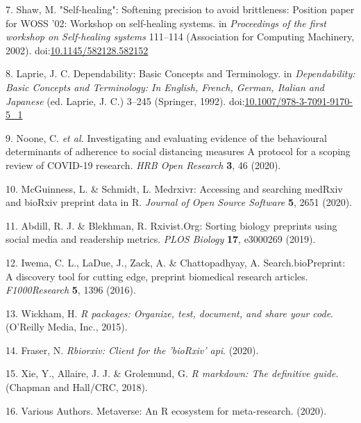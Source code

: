 \documentclass[a4paper, twoside]{templates/ociamthesis}
\begin{document}
\leavevmode\hypertarget{ref-shaw2002}{}%
7. Shaw, M. "Self-healing": Softening precision to avoid brittleness: Position paper for WOSS '02: Workshop on self-healing systems. in \emph{Proceedings of the first workshop on Self-healing systems} 111--114 (Association for Computing Machinery, 2002). doi:\href{https://doi.org/10.1145/582128.582152}{10.1145/582128.582152}

\leavevmode\hypertarget{ref-laprie1992}{}%
8. Laprie, J. C. Dependability: Basic Concepts and Terminology. in \emph{Dependability: Basic Concepts and Terminology: In English, French, German, Italian and Japanese} (ed. Laprie, J. C.) 3--245 (Springer, 1992). doi:\href{https://doi.org/10.1007/978-3-7091-9170-5_1}{10.1007/978-3-7091-9170-5\_1}

\leavevmode\hypertarget{ref-noone2020}{}%
9. Noone, C. \emph{et al.} Investigating and evaluating evidence of the behavioural determinants of adherence to social distancing measures A protocol for a scoping review of COVID-19 research. \emph{HRB Open Research} \textbf{3}, 46 (2020).

\leavevmode\hypertarget{ref-mcguinness2020a}{}%
10. McGuinness, L. \& Schmidt, L. Medrxivr: Accessing and searching medRxiv and bioRxiv preprint data in R. \emph{Journal of Open Source Software} \textbf{5}, 2651 (2020).

\leavevmode\hypertarget{ref-abdill2019}{}%
11. Abdill, R. J. \& Blekhman, R. Rxivist.Org: Sorting biology preprints using social media and readership metrics. \emph{PLOS Biology} \textbf{17}, e3000269 (2019).

\leavevmode\hypertarget{ref-iwema2016}{}%
12. Iwema, C. L., LaDue, J., Zack, A. \& Chattopadhyay, A. Search.bioPreprint: A discovery tool for cutting edge, preprint biomedical research articles. \emph{F1000Research} \textbf{5}, 1396 (2016).

\leavevmode\hypertarget{ref-wickham2015r}{}%
13. Wickham, H. \emph{R packages: Organize, test, document, and share your code}. (O'Reilly Media, Inc., 2015).

\leavevmode\hypertarget{ref-rbiorxiv}{}%
14. Fraser, N. \emph{Rbiorxiv: Client for the 'bioRxiv' api}. (2020).

\leavevmode\hypertarget{ref-xie2018r}{}%
15. Xie, Y., Allaire, J. J. \& Grolemund, G. \emph{R markdown: The definitive guide}. (Chapman and Hall/CRC, 2018).

\leavevmode\hypertarget{ref-variousauthors2020}{}%
16. Various Authors. Metaverse: An R ecosystem for meta-research. (2020).
\end{document}
